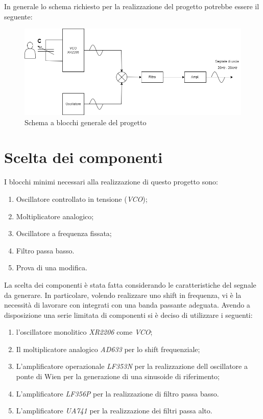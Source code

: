 \documentclass[titlepage]{report}
\begin{document}
	 In generale lo schema richiesto per la realizzazione del progetto potrebbe essere il seguente:
	 
	\begin{figure}[htbp]
		\centering
		\includegraphics[scale=0.5]{Immagini/Schema Generale PSEA.png}
		\caption{Schema a blocchi generale del progetto}
		\label{fig: schema a blocchi generico}
	\end{figure}	


\newpage

	
\chapter{Scelta dei componenti}
	\label{ch:Scelta_componenti}
	I blocchi minimi necessari alla realizzazione di questo progetto sono:
	
	\begin{enumerate}
		\item Oscillatore controllato in tensione (\textit{VCO});
		\item Moltiplicatore analogico;
		\item Oscillatore a frequenza fissata;
		\item Filtro passa basso.
		\item Prova di una modifica.
	\end{enumerate}
	
	\noindent La scelta dei componenti è stata fatta considerando le caratteristiche del segnale da generare. In particolare, volendo realizzare uno shift in frequenza, vi è la necessità di lavorare con integrati con una banda passante adeguata.
	Avendo a disposizione una serie limitata di componenti si è deciso di utilizzare i seguenti:
	
	\begin{enumerate}
		\item l'oscillatore monolitico \textit{XR2206} come \textit{VCO};
		\item Il moltiplicatore analogico \textit{AD633} per lo shift frequenziale;
		\item L'amplificatore operazionale \textit{LF353N} per la realizzazione dell oscillatore a ponte di Wien per la generazione di una sinusoide di riferimento;
		\item L'amplificatore \textit{LF356P} per la realizzazione di filtro passa basso.
		\item L'amplificatore \textit{UA741} per la realizzazione dei filtri passa alto.
	\end{enumerate}
	
\end{document}
